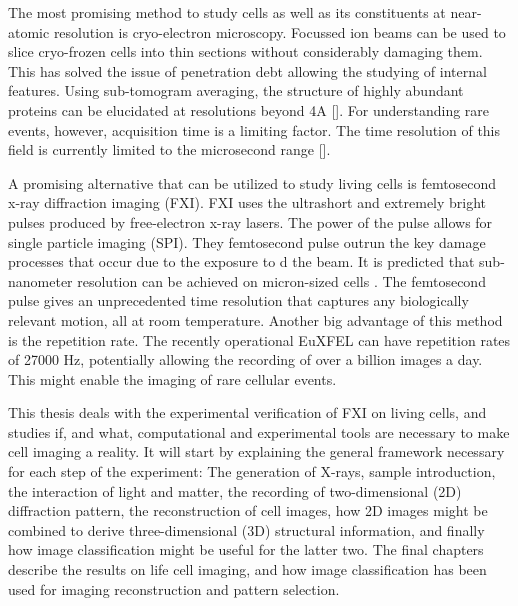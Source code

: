The most promising method to study cells as well as its constituents at near-atomic resolution is cryo-electron microscopy. Focussed ion beams can be used to slice cryo-frozen cells into thin sections without considerably damaging them. This has solved the issue of penetration debt allowing the studying of internal features. Using sub-tomogram averaging, the structure of highly abundant proteins can be elucidated at resolutions beyond 4A []. For understanding rare events, however, acquisition time is a limiting factor. The time resolution of this field is currently limited to the microsecond range [].

A promising alternative that can be utilized to study living cells is femtosecond x-ray diffraction imaging (FXI). FXI uses the ultrashort and extremely bright pulses produced by free-electron x-ray lasers. The power of the pulse allows for single particle imaging (SPI). They femtosecond pulse outrun the key damage processes that occur due to the exposure to d
the beam. It is predicted that sub-nanometer resolution can be achieved on micron-sized cells  \cite{Bergh2008}. The femtosecond pulse gives an unprecedented time resolution that captures any biologically relevant motion, all at room temperature. Another big advantage of this method is the repetition rate. The recently operational EuXFEL can have repetition rates of 27000 Hz, potentially allowing the recording of over a billion images a day. This might enable the imaging of rare cellular events.

This thesis deals with the experimental verification of FXI on living cells, and studies if, and what, computational and experimental tools are necessary to make cell imaging a reality. It will start by explaining the general framework necessary for each step of the experiment: The generation of X-rays, sample introduction, the interaction of light and matter, the recording of two-dimensional (2D) diffraction pattern, the reconstruction of cell images, how 2D images might be combined to derive three-dimensional (3D) structural information, and finally how image classification might be useful for the latter two. The final chapters describe the results on life cell imaging, and how image classification has been used for imaging reconstruction and pattern selection.



